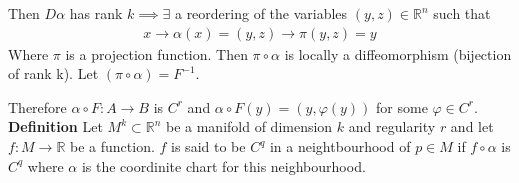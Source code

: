Then $D \alpha$ has rank $k \implies \exists$ a reordering of the variables $(y,z) \in \mathbb{R}^n$ such that
\begin{align*}
x \to \alpha(x) = (y, z) \to \pi(y, z) = y
\end{align*}
Where $\pi$ is a projection function. Then $\pi \circ \alpha$ is locally a diffeomorphism (bijection of rank k). Let $(\pi \circ \alpha) = F^{-1}$.

Therefore $\alpha \circ F: A \to B$ is $C^r$ and $\alpha \circ F(y) = (y, \varphi(y))$ for some $\varphi \in C^r$. 
\newline\newline
\textbf{Definition} Let $M^k \subset \mathbb{R}^n$ be a manifold of dimension $k$ and regularity $r$ and let $f:M \to \mathbb{R}$ be a function. $f$ is said to be $C^q$ in a neightbourhood of $p \in M$ if $f \circ \alpha$ is $C^q$ where $\alpha$ is the coordinite chart for this neighbourhood.
\newline\newline
